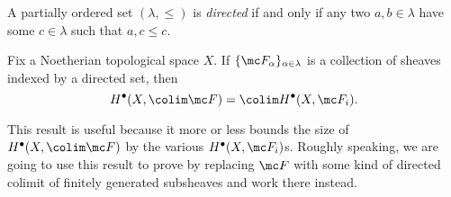 \documentclass[../notes.tex]{subfiles}
\begin{document}
\begin{definition}
	A partially ordered set $(\lambda,\le)$ is \textit{directed} if and only if any two $a,b\in\lambda$ have some $c\in\lambda$ such that $a,c\le c$.
\end{definition}
\begin{lemma}
	Fix a Noetherian topological space $X$. If $\{\mc F_\alpha\}_{\alpha\in\lambda}$ is a collection of sheaves indexed by a directed set, then
	\[H^\bullet(X,\colim\mc F)=\colim H^\bullet(X,\mc F_i).\]
\end{lemma}
This result is useful because it more or less bounds the size of $H^\bullet(X,\colim\mc F)$ by the various $H^\bullet(X,\mc F_i)$s. Roughly speaking, we are going to use this result to prove  by replacing $\mc F$ with some kind of directed colimit of finitely generated subsheaves and work there instead.
\end{document}
